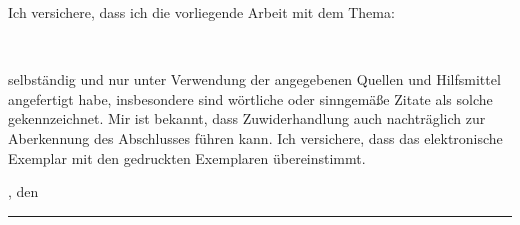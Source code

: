 Ich versichere, dass ich die vorliegende Arbeit mit dem Thema:

\begin{center}
  \textit{\glqq\titel\grqq}\\[1em]
\end{center}

selbständig und nur unter Verwendung der angegebenen Quellen und Hilfsmittel angefertigt habe, insbesondere sind wörtliche oder sinngemäße Zitate als solche gekennzeichnet. Mir ist bekannt, dass Zuwiderhandlung auch nachträglich zur Aberkennung des Abschlusses führen kann. Ich versichere, dass das elektronische Exemplar mit den gedruckten Exemplaren übereinstimmt.
\par
\ort, den \eingereicht

\rule[-0.2cm]{5cm}{0.5pt}

\textsc{\autor}
